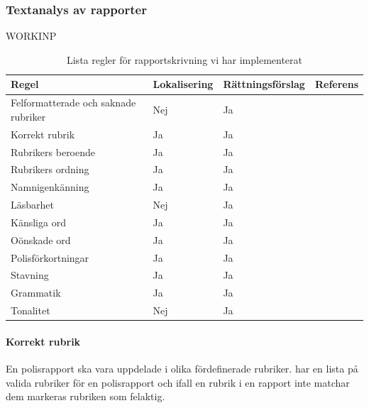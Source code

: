 \documentclass[swedish]{maucsthesis}
\begin{document}
\subsubsection{Textanalys av rapporter}
WORKINP

\begin{table}[H]
\centering
\begin{tabular}{|l|l|l|l|}
\hline
Regel                                & Lokalisering & Rättningsförslag & Referens \\ \hline
Felformatterade och saknade rubriker & Nej          & Ja               &          \\ \hline
Korrekt rubrik                       & Ja           & Ja               &          \\ \hline
Rubrikers beroende                   & Ja           & Ja               &          \\ \hline
Rubrikers ordning                    & Ja           & Ja               &          \\ \hline
Namnigenkänning                      & Ja           & Ja               &          \\ \hline
Läsbarhet                            & Nej          & Ja               &          \\ \hline
Känsliga ord                         & Ja           & Ja               &          \\ \hline
Oönskade ord                         & Ja           & Ja               &          \\ \hline
Polisförkortningar                   & Ja           & Ja               &          \\ \hline
Stavning                             & Ja           & Ja               &          \\ \hline
Grammatik                            & Ja           & Ja               &          \\ \hline
Tonalitet                            & Nej          & Ja               &          \\ \hline
\end{tabular}
\caption{Lista regler för rapportskrivning vi har implementerat}
\label{rulestable}
\end{table}

\paragraph{Korrekt rubrik}
En polisrapport ska vara uppdelade i olika fördefinerade rubriker.
\cite{durtva:2017} har en lista på valida rubriker för en polisrapport och ifall
en rubrik i en rapport inte matchar dem markeras rubriken som felaktig.
\end{document}
